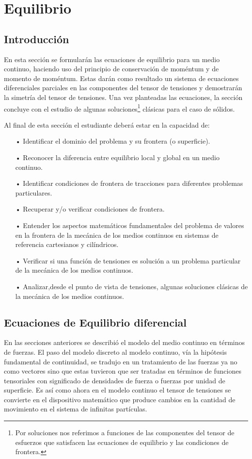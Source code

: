 \documentclass[../notas medios.tex]{subfiles}
\begin{document}
\chapter{Equilibrio}

\graphicspath{{img/Cap4/}} 	%
\section{Introducción}

En esta sección se formularán las ecuaciones de equilibrio para un medio continuo, haciendo uso del principio de conservación de moméntum y de momento de moméntum. Estas darán como resultado un sistema de ecuaciones diferenciales parciales en las componentes del tensor de tensiones y demostrarán la simetría del tensor de tensiones. Una vez planteadas las ecuaciones, la sección concluye con el estudio de algunas soluciones\footnote{Por soluciones nos referimos a funciones de las componentes del tensor de esfuerzos que satisfacen las ecuaciones de equilibrio y las condiciones de frontera.} clásicas para el caso de sólidos.

Al final de esta sección el estudiante deberá estar en la capacidad de:

\begin{itemize}
\item[•] Identificar el dominio del problema y su frontera (o superficie).
\item[•] Reconocer la diferencia entre equilibrio local y global en un medio continuo.
\item[•] Identificar condiciones de frontera de tracciones para diferentes problemas particulares.
\item[•] Recuperar y/o verificar condiciones de frontera.
\item[•] Entender los aspectos matemáticos fundamentales del problema de valores en la frontera de la mecánica de los medios continuos en sistemas de referencia cartesianos y cilíndricos.
\item[•] Verificar si una función de tensiones es solución a un problema particular de la mecánica de los medios continuos.
\item[•] Analizar,desde el punto de vista de tensiones, algunas soluciones clásicas de la mecánica de los medios continuos.
\end{itemize}


\section{Ecuaciones de Equilibrio diferencial}
En las secciones anteriores se describió el modelo del medio continuo en términos de fuerzas.  El paso del modelo discreto al modelo continuo, vía la hipótesis fundamental de continuidad, se tradujo en un tratamiento de las fuerzas ya no como vectores sino que estas tuvieron que ser tratadas en términos de funciones tensoriales con significado de densidades de fuerza o fuerzas por unidad de superficie.  Es así como ahora en el modelo continuo el tensor de tensiones se convierte en el dispositivo matemático que produce cambios en la cantidad de movimiento en el sistema de infinitas partículas.
\end{document}

